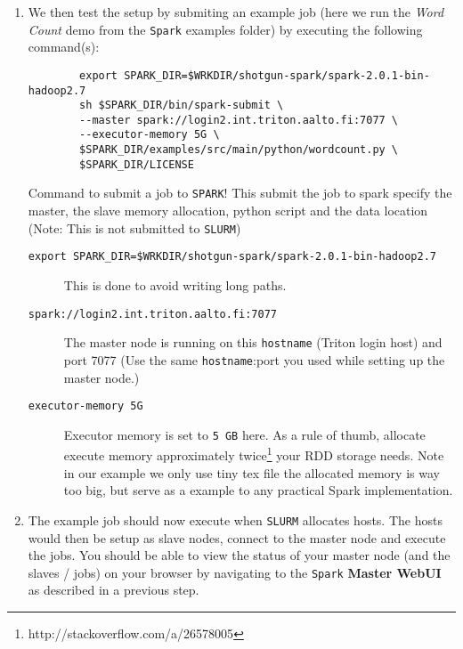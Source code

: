 \documentclass[a4paper,11pt]{article}
\begin{document}
\begin{enumerate}
	Note that, on submitting the job you will get a \textit{jobID} remeber this number. \\
	You can now check the status of your request by running the \textbf{slurm q} command to see the complete \texttt{SLURM} job queue (including your job) or by running \texttt{slurm j <jobid>}. You can find more information about managing your jobs on triton here\footnote{https://wiki.aalto.fi/pages/viewpage.action?pageId=116668503}
	\item We then test the setup by submiting an example job (here we run the \textit{Word Count} demo from the \texttt{Spark} examples folder) by executing the following command(s):\\
	\begin{listing}
		\begin{verbatim}
		export SPARK_DIR=$WRKDIR/shotgun-spark/spark-2.0.1-bin-hadoop2.7      
		sh $SPARK_DIR/bin/spark-submit \
		--master spark://login2.int.triton.aalto.fi:7077 \
		--executor-memory 5G \
		$SPARK_DIR/examples/src/main/python/wordcount.py \
		$SPARK_DIR/LICENSE
		\end{verbatim}
		\caption{Command to submit a job to \texttt{SPARK}! This submit the job to spark specify the master, the slave memory allocation, python script and the data location (Note: This is not submitted to \texttt{SLURM})}
	\end{listing}
	\begin{description}
		\item[\texttt{export SPARK\_DIR=\$WRKDIR/shotgun-spark/spark-2.0.1-bin-hadoop2.7}] This is done to avoid writing long paths.
		\item[\texttt{spark://login2.int.triton.aalto.fi:7077}] The master node is running on this \texttt{hostname} (Triton login host) and port 7077 (Use the same \texttt{hostname}:port you used while setting up the master node.)
		\item[\texttt{executor-memory 5G}] Executor memory is set to \texttt{5 GB} here. As a rule of thumb, allocate execute memory approximately twice\footnote{http://stackoverflow.com/a/26578005} your RDD storage needs. Note in our example we only use tiny tex file the allocated memory is way too big, but serve as a example to any practical Spark implementation.
	\end{description}
	\item The example job should now execute when \texttt{SLURM} allocates hosts. The hosts would then be setup as slave nodes, connect to the master node and execute the jobs. You should be able to view the status of your master node (and the slaves / jobs) on your browser by navigating to the \texttt{Spark} \textbf{Master WebUI} as described in a previous step.
\end{enumerate}
\end{document}
